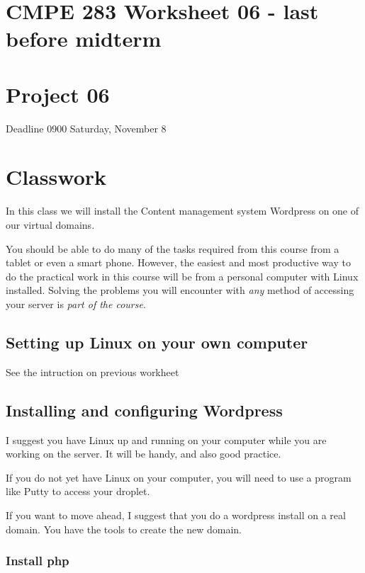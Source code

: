 \documentclass[12pt, a4paper]{article}
\begin{document}

\section*{CMPE 283 Worksheet 06 - last before midterm}
\section*{Project 06} 
Deadline 0900 Saturday, November 8


\section*{Classwork}
In this class we will install the Content management system Wordpress on one of our virtual domains.


You should be able to do many of the tasks required from this course from a tablet or even a smart phone. However, the easiest and most productive way to do the practical work in this course will be from a personal computer with Linux installed. Solving the problems you will encounter with \emph{any} method of accessing your server is \emph{part of the course}.

\subsection*{Setting up Linux on your own computer}

See the intruction on previous workheet

\subsection*{Installing and configuring Wordpress}


I suggest you have Linux up and running on your computer while you are working on the server. It will be handy, and also good practice.

If you do not yet have Linux on your computer, you will need to use a program like Putty to access your droplet.


If you want to move ahead, I suggest that you do a wordpress install on a real domain. You have the tools to create the new domain.

\subsubsection*{Install php}
\end{document}
